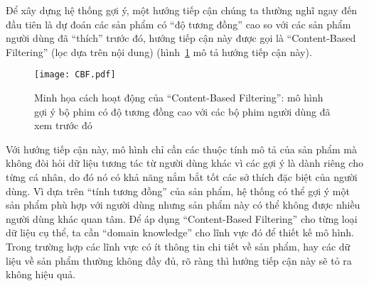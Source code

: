 Để xây dựng hệ thống gợi ý, một hướng tiếp cận chúng ta thường nghĩ ngay đến đầu tiên
là dự đoán các sản phẩm có ``độ tương đồng'' cao so với các sản phẩm người dùng đã ``thích'' trước đó,
hướng tiếp cận này được gọi là ``Content-Based Filtering'' (lọc dựa trên nội dung) (hình~\ref{fig_CBF} mô tả hướng tiếp cận này).
\begin{figure}
    \centering
	\texttt{[image: CBF.pdf]}
    \caption{Minh họa cách hoạt động của ``Content-Based Filtering'':
    mô hình gợi ý bộ phim có độ tương đồng cao với các bộ phim
    người dùng đã xem trước đó}
    \label{fig_CBF}
\end{figure}
Với hướng tiếp cận này, mô hình chỉ cần các thuộc tính mô tả của sản phẩm mà 
không đòi hỏi dữ liệu tương tác từ người dùng khác
vì các gợi ý là dành riêng cho từng cá nhân, do đó nó có khả năng nắm bắt tốt các sở thích
đặc biệt của người dùng.
Vì dựa trên ``tính tương đồng'' của sản phẩm, hệ thống có thể gợi ý một sản phẩm phù hợp với người dùng nhưng sản phẩm này có thể không được nhiều người dùng khác quan tâm.
Để áp dụng ``Content-Based Filtering'' cho từng loại dữ liệu cụ thể,
ta cần ``domain knowledge'' cho lĩnh vực đó để thiết kế mô hình.
Trong trường hợp các lĩnh vực có ít thông tin chi tiết về sản phẩm, hay các dữ liệu về sản phẩm thường không đầy đủ, rõ ràng thì 
hướng tiếp cận này sẽ tỏ ra không hiệu quả. 

